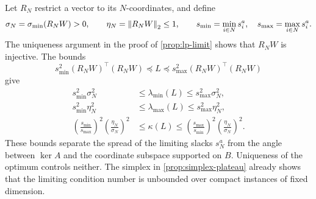 Let $R_N$ restrict a vector to its $N$-coordinates, and define
\[
 \sigma_N=\sigma_{\min}(R_NW)>0,\qquad
 \eta_N=\left\lVert R_NW\right\rVert_2\leq1,\qquad
 s_{\min}=\min_{i\in N}s_i^a,\quad
 s_{\max}=\max_{i\in N}s_i^a.
\]
The uniqueness argument in the proof of \cref{prop:lp-limit} shows that
$R_NW$ is injective.
The bounds
\begin{equation}
 s_{\min}^2(R_NW)^\top(R_NW)
 \preceq L\preceq
 s_{\max}^2(R_NW)^\top(R_NW)
 \label{eq:lp-active-loewner}
\end{equation}
give
\begin{align}
 s_{\min}^2\sigma_N^2&\leq\lambda_{\min}(L)
       \leq s_{\max}^2\sigma_N^2,\label{eq:lp-min-constant}\\
 s_{\min}^2\eta_N^2&\leq\lambda_{\max}(L)
       \leq s_{\max}^2\eta_N^2,\label{eq:lp-max-constant}\\
 \left(\frac{s_{\min}}{s_{\max}}\right)^2
 \left(\frac{\eta_N}{\sigma_N}\right)^2
 &\leq\kappa(L)\leq
 \left(\frac{s_{\max}}{s_{\min}}\right)^2
 \left(\frac{\eta_N}{\sigma_N}\right)^2.
 \label{eq:lp-limit-bounds}
\end{align}
These bounds separate the spread of the limiting slacks $s_N^a$ from
the angle between $\ker A$ and the coordinate subspace supported on
$B$. Uniqueness of the optimum controls neither. The simplex in
\cref{prop:simplex-plateau} already shows that the limiting condition
number is unbounded over compact instances of fixed dimension.

